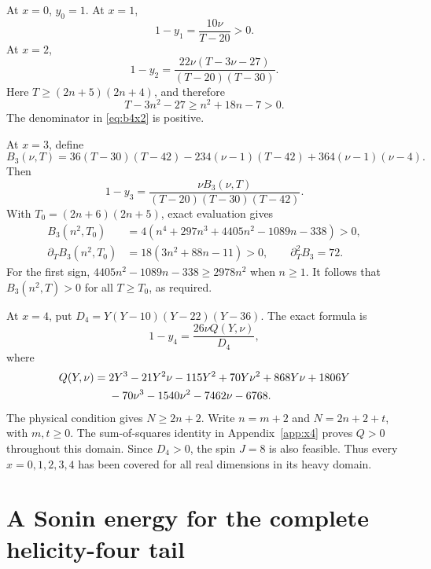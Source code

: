 \documentclass[11pt]{article}
\theoremstyle{remark}
\numberwithin{equation}{section}
\begin{document}
At $x=0$, $y_0=1$. At $x=1$,
\begin{equation}
 1-y_1=\frac{10\nu}{T-20}>0.
 \label{eq:b4x1}
\end{equation}
At $x=2$,
\begin{equation}
 1-y_2=\frac{22\nu(T-3\nu-27)}{(T-20)(T-30)}.
 \label{eq:b4x2}
\end{equation}
Here $T\ge(2n+5)(2n+4)$, and therefore
\[
 T-3n^2-27\ge n^2+18n-7>0.
\]
The denominator in \eqref{eq:b4x2} is positive.

At $x=3$, define
\begin{equation}
 B_3(\nu,T)=36(T-30)(T-42)-234(\nu-1)(T-42)
                  +364(\nu-1)(\nu-4).
 \label{eq:B3}
\end{equation}
Then
\begin{equation}
 1-y_3=\frac{\nu B_3(\nu,T)}{(T-20)(T-30)(T-42)}.
 \label{eq:b4x3}
\end{equation}
With $T_0=(2n+6)(2n+5)$, exact evaluation gives
\begin{align}
 B_3(n^2,T_0)&=4(n^4+297n^3+4405n^2-1089n-338)>0,
 \label{eq:B3initial}\\
 \partial_T B_3(n^2,T_0)&=18(3n^2+88n-11)>0,
 \qquad\partial_T^2 B_3=72.
 \label{eq:B3derivative}
\end{align}
For the first sign, $4405n^2-1089n-338\ge2978n^2$ when $n\ge1$.
It follows that $B_3(n^2,T)>0$ for all $T\ge T_0$, as required.

At $x=4$, put $D_4=Y(Y-10)(Y-22)(Y-36)$. The exact formula is
\begin{equation}
 1-y_4=\frac{26\nu Q(Y,\nu)}{D_4},
 \label{eq:b4x4}
\end{equation}
where
\begin{align}
 Q(Y,\nu)={}&2Y^3-21Y^2\nu-115Y^2+70Y\nu^2+868Y\nu+1806Y\notag\\
            &-70\nu^3-1540\nu^2-7462\nu-6768.
 \label{eq:Q4}
\end{align}
The physical condition gives $N\ge2n+2$. Write $n=m+2$ and
$N=2n+2+t$, with $m,t\ge0$. The sum-of-squares identity in
Appendix~\ref{app:x4} proves $Q>0$ throughout this domain. Since $D_4>0$,
the spin $J=8$ is also feasible. Thus every $x=0,1,2,3,4$ has been covered
for all real dimensions in its heavy domain.

\section{A Sonin energy for the complete helicity-four tail}
\label{sec:sonin}
\end{document}
